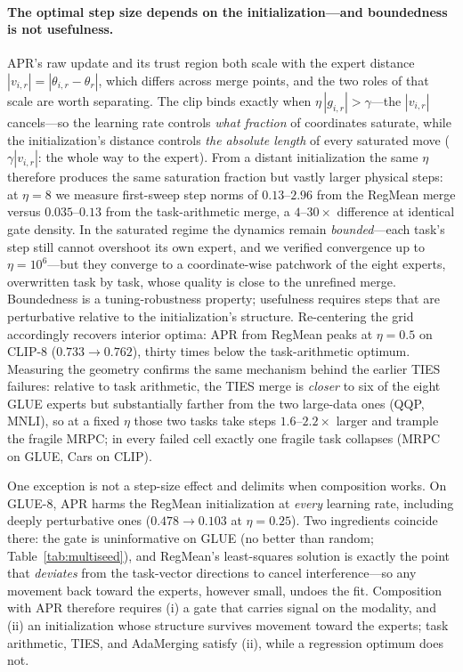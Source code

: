 \documentclass[11pt]{article}
\begin{document}
\paragraph{The optimal step size depends on the initialization---and boundedness is not usefulness.}
APR's raw update and its trust region both scale with the expert distance $|v_{i,r}| = |\theta_{i,r} - \theta_r|$, which differs across merge points, and the two roles of that scale are worth separating. The clip binds exactly when $\eta\,|g_{i,r}| > \gamma$---the $|v_{i,r}|$ cancels---so the learning rate controls \emph{what fraction} of coordinates saturate, while the initialization's distance controls \emph{the absolute length} of every saturated move ($\gamma|v_{i,r}|$: the whole way to the expert). From a distant initialization the same $\eta$ therefore produces the same saturation fraction but vastly larger physical steps: at $\eta=8$ we measure first-sweep step norms of $0.13$--$2.96$ from the RegMean merge versus $0.035$--$0.13$ from the task-arithmetic merge, a $4$--$30\times$ difference at identical gate density. In the saturated regime the dynamics remain \emph{bounded}---each task's step still cannot overshoot its own expert, and we verified convergence up to $\eta=10^6$---but they converge to a coordinate-wise patchwork of the eight experts, overwritten task by task, whose quality is close to the unrefined merge. Boundedness is a tuning-robustness property; usefulness requires steps that are perturbative relative to the initialization's structure. Re-centering the grid accordingly recovers interior optima: APR from RegMean peaks at $\eta=0.5$ on CLIP-8 ($0.733\to0.762$), thirty times below the task-arithmetic optimum. Measuring the geometry confirms the same mechanism behind the earlier TIES failures: relative to task arithmetic, the TIES merge is \emph{closer} to six of the eight GLUE experts but substantially farther from the two large-data ones (QQP, MNLI), so at a fixed $\eta$ those two tasks take steps $1.6$--$2.2\times$ larger and trample the fragile MRPC; in every failed cell exactly one fragile task collapses (MRPC on GLUE, Cars on CLIP).

One exception is not a step-size effect and delimits when composition works. On GLUE-8, APR harms the RegMean initialization at \emph{every} learning rate, including deeply perturbative ones ($0.478\to0.103$ at $\eta=0.25$). Two ingredients coincide there: the gate is uninformative on GLUE (no better than random; Table~\ref{tab:multiseed}), and RegMean's least-squares solution is exactly the point that \emph{deviates} from the task-vector directions to cancel interference---so any movement back toward the experts, however small, undoes the fit. Composition with APR therefore requires (i) a gate that carries signal on the modality, and (ii) an initialization whose structure survives movement toward the experts; task arithmetic, TIES, and AdaMerging satisfy (ii), while a regression optimum does not.
\end{document}
